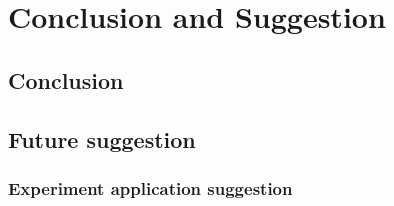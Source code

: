 \chapter{Conclusion and Suggestion}
\section{Conclusion}


\section{Future suggestion}

\subsection{Experiment application suggestion}

